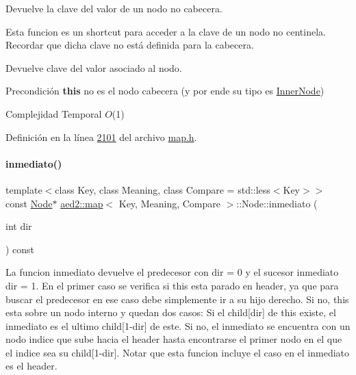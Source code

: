 Devuelve la clave del valor de un nodo no cabecera. 

Esta funcion es un shortcut para acceder a la clave de un nodo no centinela. Recordar que dicha clave no está definida para la cabecera.

\begin{DoxyReturn}{Devuelve}
clave del valor asociado al nodo.
\end{DoxyReturn}
\begin{DoxyPrecond}{Precondición}
{\bfseries this} no es el nodo cabecera (y por ende su tipo es \hyperlink{structaed2_1_1map_1_1InnerNode}{Inner\+Node})
\end{DoxyPrecond}

\begin{DoxyDescription}
\item[Complejidad Temporal]$O$(1)
\end{DoxyDescription}

Definición en la línea \hyperlink{map_8h_source_l02101}{2101} del archivo \hyperlink{map_8h_source}{map.\+h}.

\mbox{\label{structaed2_1_1map_1_1Node_af812885685c8c3285136d444d5169b28_af812885685c8c3285136d444d5169b28}} 
\paragraph{\texorpdfstring{inmediato()}{inmediato()}}
{\footnotesize\ttfamily template$<$class Key, class Meaning, class Compare = std\+::less$<$\+Key$>$$>$ \\
const \hyperlink{structaed2_1_1map_1_1Node}{Node}$\ast$ \hyperlink{classaed2_1_1map}{aed2\+::map}$<$ Key, Meaning, Compare $>$\+::Node\+::inmediato (\begin{DoxyParamCaption}\item[{int}]{dir }\end{DoxyParamCaption}) const\hspace{0.3cm}{\ttfamily [inline]}}

La funcion inmediato devuelve el predecesor con dir = 0 y el sucesor inmediato dir = 1. En el primer caso se verifica si this esta parado en header, ya que para buscar el predecesor en ese caso debe simplemente ir a su hijo derecho. Si no, this esta sobre un nodo interno y quedan dos casos\+: Si el child\mbox{[}dir\mbox{]} de this existe, el inmediato es el ultimo child\mbox{[}1-\/dir\mbox{]} de este. Si no, el inmediato se encuentra con un nodo indice que sube hacia el header hasta encontrarse el primer nodo en el que el indice sea su child\mbox{[}1-\/dir\mbox{]}. Notar que esta funcion incluye el caso en el inmediato es el header.


